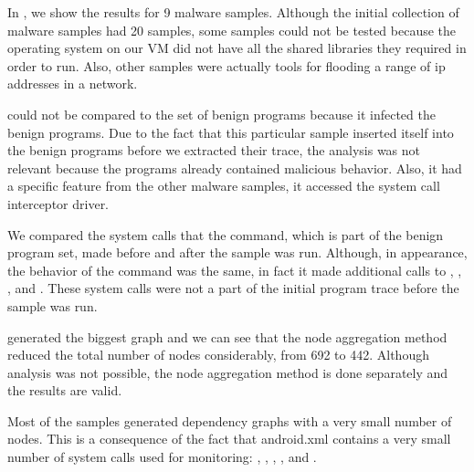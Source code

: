 In , we show the results for 9 malware samples. Although the initial collection of malware samples had 20 samples, some samples could not be tested because the operating system on our VM did not have all the shared libraries they required in order to run. Also, other samples were actually tools for flooding a range of ip addresses in a network.

 could not be compared to the set of benign programs because it infected the benign programs. Due to the fact that this particular sample inserted itself into the benign programs before we extracted their trace, the analysis was not relevant because the programs already contained malicious behavior. Also, it had a specific feature from the other malware samples, it accessed the system call interceptor driver.

We compared the system calls that the  command, which is part of the benign program set, made before and after the  sample was run. Although, in appearance, the behavior of the command was the same, in fact it made additional calls to , , ,  and . These system calls were not a part of the initial program trace before the sample was run.

 generated the biggest graph and we can see that the node aggregation method reduced the total number of nodes considerably, from 692 to 442. Although analysis was not possible, the node aggregation method is done separately and the results are valid.

Most of the samples generated dependency graphs with a very small number of nodes. This is a consequence of the fact that android.xml contains a very small number of system calls used for monitoring: , , , ,  and .

